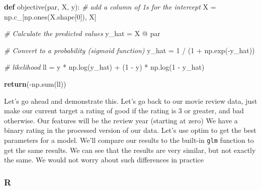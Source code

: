 \documentclass[
  letterpaper,
]{krantz}
\newenvironment{Shaded}{}{}
\newcommand{\BuiltInTok}[1]{\textcolor[rgb]{0.00,0.50,0.00}{#1}}
\newcommand{\CommentTok}[1]{\textcolor[rgb]{0.38,0.63,0.69}{\textit{#1}}}
\newcommand{\ControlFlowTok}[1]{\textcolor[rgb]{0.00,0.44,0.13}{\textbf{#1}}}
\newcommand{\DecValTok}[1]{\textcolor[rgb]{0.25,0.63,0.44}{#1}}
\newcommand{\KeywordTok}[1]{\textcolor[rgb]{0.00,0.44,0.13}{\textbf{#1}}}
\newcommand{\NormalTok}[1]{#1}
\newcommand{\OperatorTok}[1]{\textcolor[rgb]{0.40,0.40,0.40}{#1}}
\begin{document}
\begin{Shaded}
\begin{Highlighting}[]
\KeywordTok{def}\NormalTok{ objective(par, X, y):}
    \CommentTok{\# add a column of 1s for the intercept}
\NormalTok{    X }\OperatorTok{=}\NormalTok{ np.c\_[np.ones(X.shape[}\DecValTok{0}\NormalTok{]), X]}

    \CommentTok{\# Calculate the predicted values}
\NormalTok{    y\_hat }\OperatorTok{=}\NormalTok{ X }\OperatorTok{@}\NormalTok{ par}
    
    \CommentTok{\# Convert to a probability (\textquotesingle{}sigmoid\textquotesingle{} function)}
\NormalTok{    y\_hat }\OperatorTok{=} \DecValTok{1} \OperatorTok{/}\NormalTok{ (}\DecValTok{1} \OperatorTok{+}\NormalTok{ np.exp(}\OperatorTok{{-}}\NormalTok{y\_hat))}
    
    \CommentTok{\# likelihood}
\NormalTok{    ll }\OperatorTok{=}\NormalTok{ y }\OperatorTok{*}\NormalTok{ np.log(y\_hat) }\OperatorTok{+}\NormalTok{ (}\DecValTok{1} \OperatorTok{{-}}\NormalTok{ y) }\OperatorTok{*}\NormalTok{ np.log(}\DecValTok{1} \OperatorTok{{-}}\NormalTok{ y\_hat)}
    
    \ControlFlowTok{return}\NormalTok{(}\OperatorTok{{-}}\NormalTok{np.}\BuiltInTok{sum}\NormalTok{(ll))}
\end{Highlighting}
\end{Shaded}

Let's go ahead and demonstrate this. Let's go back to our movie review
data, just make our current target a rating of good if the rating is 3
or greater, and bad otherwise. Our features will be the review year
(starting at zero) We have a binary rating in the processed version of
our data. Let's use optim to get the best parameters for a model. We'll
compare our results to the built-in \texttt{glm} function to get the
same results. We can see that the results are very similar, but not
exactly the same. We would not worry about such differences in practice

\subsubsection{R}
\end{document}
